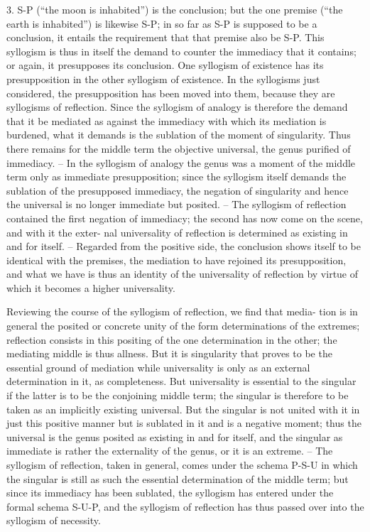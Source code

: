 3. S-P (“the moon is inhabited”) is the conclusion; but the one premise
(“the earth is inhabited”) is likewise S-P; in so far as S-P is supposed to
be a conclusion, it entails the requirement that that premise also be S-P.
This syllogism is thus in itself the demand to counter the immediacy that it
contains; or again, it presupposes its conclusion. One syllogism of existence
has its presupposition in the other syllogism of existence. In the syllogisms
just considered, the presupposition has been moved into them, because
they are syllogisms of reflection. Since the syllogism of analogy is therefore
the demand that it be mediated as against the immediacy with which its
mediation is burdened, what it demands is the sublation of the moment of
singularity. Thus there remains for the middle term the objective universal,
the genus purified of immediacy. – In the syllogism of analogy the genus
was a moment of the middle term only as immediate presupposition; since
the syllogism itself demands the sublation of the presupposed immediacy,
the negation of singularity and hence the universal is no longer immediate
but posited. – The syllogism of reflection contained the first negation of
immediacy; the second has now come on the scene, and with it the exter-
nal universality of reflection is determined as existing in and for itself. –
Regarded from the positive side, the conclusion shows itself to be identical
with the premises, the mediation to have rejoined its presupposition, and
what we have is thus an identity of the universality of reflection by virtue
of which it becomes a higher universality.

Reviewing the course of the syllogism of reflection, we find that media-
tion is in general the posited or concrete unity of the form determinations of
the extremes; reflection consists in this positing of the one determination
in the other; the mediating middle is thus allness. But it is singularity that
proves to be the essential ground of mediation while universality is only as
an external determination in it, as completeness. But universality is essential
to the singular if the latter is to be the conjoining middle term; the singular
is therefore to be taken as an implicitly existing universal. But the singular
is not united with it in just this positive manner but is sublated in it and
is a negative moment; thus the universal is the genus posited as existing in
and for itself, and the singular as immediate is rather the externality of the
genus, or it is an extreme. – The syllogism of reflection, taken in general,
comes under the schema P-S-U in which the singular is still as such the
essential determination of the middle term; but since its immediacy has
been sublated, the syllogism has entered under the formal schema S-U-P,
and the syllogism of reflection has thus passed over into the syllogism of
necessity.

